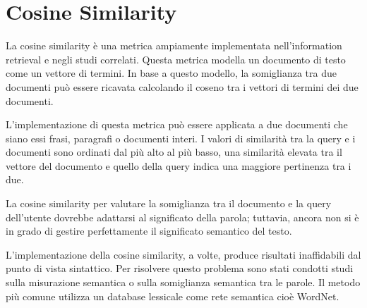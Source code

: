 \section{Cosine Similarity}
La cosine similarity è una metrica ampiamente implementata nell’information retrieval e negli studi correlati. Questa metrica modella un documento di testo come un vettore di termini. In base a questo modello, la somiglianza tra due documenti può essere ricavata calcolando il coseno tra i vettori di termini dei due documenti.

L’implementazione di questa metrica può essere applicata a due documenti che siano essi frasi, paragrafi o documenti interi. I valori di similarità tra la query e i documenti sono ordinati dal più alto al più basso, una similarità elevata tra il vettore del documento e quello della query indica una maggiore pertinenza tra i due. 

La cosine similarity per valutare la somiglianza tra il documento e la query dell’utente dovrebbe adattarsi al significato della parola; tuttavia, ancora non si è in grado di gestire perfettamente il significato semantico del testo.

L’implementazione della cosine similarity, a volte, produce risultati inaffidabili dal punto di vista sintattico. Per risolvere questo problema sono stati condotti studi sulla misurazione semantica o sulla somiglianza semantica tra le parole. Il metodo più comune utilizza un database lessicale come rete semantica cioè WordNet. 

